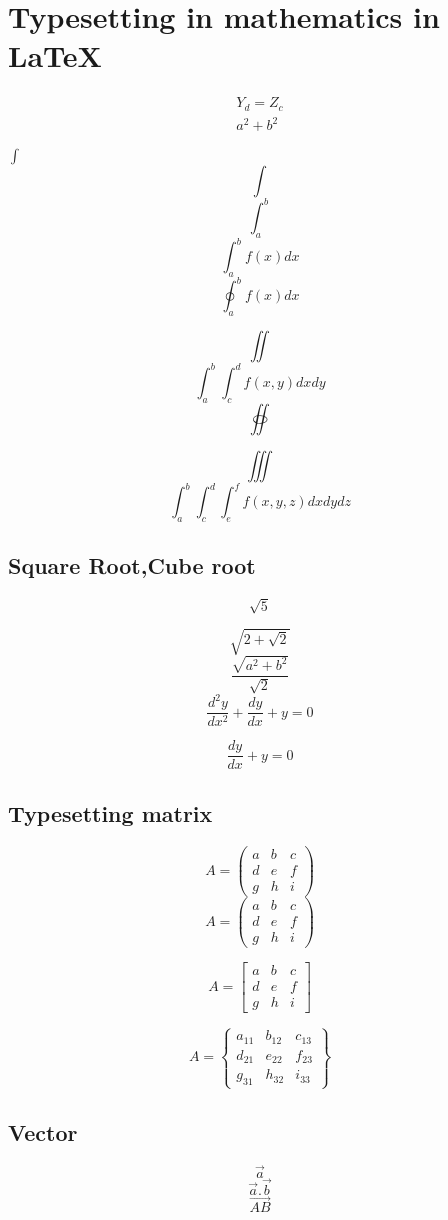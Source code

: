 \documentclass[a4paper]{report}
\begin{document}
\chapter{Typesetting in mathematics in \LaTeX}

\begin{eqnarray}
Y_d=Z_c\\
a^2+b^2
\end{eqnarray}

$\int$
$$\int$$
$$\int_a^b$$
$$\int_a^b f(x) dx$$
$$\oint_a^b f(x) dx$$

$$\iint$$
$$\int_a^b\int_c^d f(x,y) dx dy$$
$$\oiint$$

$$\iiint$$
$$\int_a^b\int_c^d\int_e^f f(x,y,z) dx dy dz$$

\section{Square Root,Cube root}
$$\sqrt{5}$$

$$\sqrt{2+\sqrt{2}}$$
$$\frac{\sqrt{a^2+b^2}}{\sqrt{2}}$$
$$\frac{d^{2}y}{dx^2}+\frac{dy}{dx}+y=0$$

$$\frac{dy}{dx}+y=0$$

\section{Typesetting matrix}
\begin{equation}
	A =(
	\begin{array}{ccc}
	a & b & c\\
	d & e & f\\
	g & h & i
	\end{array}
	)
\end{equation}
$$
	A = \left(
	\begin{array}{ccc}
	a & b & c\\
	d & e & f\\
	g & h & i
	\end{array}
	\right)
$$

$$
	A = \left[
	\begin{array}{ccc}
	a & b & c\\
	d & e & f\\
	g & h & i
	\end{array}
	\right]
$$

$$
	A = \left\{
	\begin{array}{ccc}
	a_{11} & b_{12} & c_{13}\\
	d_{21}& e_{22} & f_{23}\\
	g_{31} & h_{32} & i_{33}
	\end{array}
	\right\}
$$

\section{Vector}
$$\overset{\rightarrow}{a}$$
$$\overset{\rightarrow}{a}.\overset{\rightarrow}{b}$$
$$\vec{AB}$$
\end{document}
